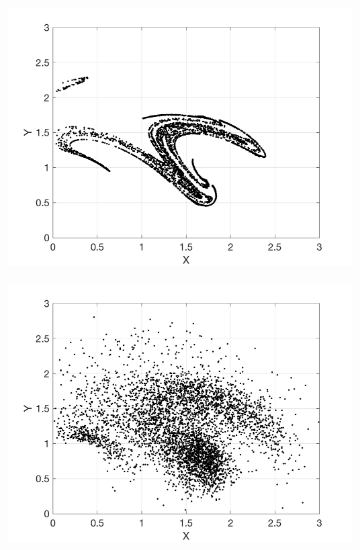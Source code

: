 \documentclass[12pt]{article}
\begin{document}
\begin{figure}[H]
	\centering
	\begin{subfigure}[b]{0.3\textwidth}
		\centering
		\includegraphics[width=\textwidth]{plots/l84l63/poincare_xy_u5.png}
	\end{subfigure}
	\hfill
	\begin{subfigure}[b]{0.3\textwidth}
		\centering
		\includegraphics[width=\textwidth]{plots/l84l63/poincare_xy_c5.png}
	\end{subfigure}
	\hfill
	\begin{subfigure}[b]{0.3\textwidth}
		\centering

\end{subfigure}
\end{figure}
\end{document}
